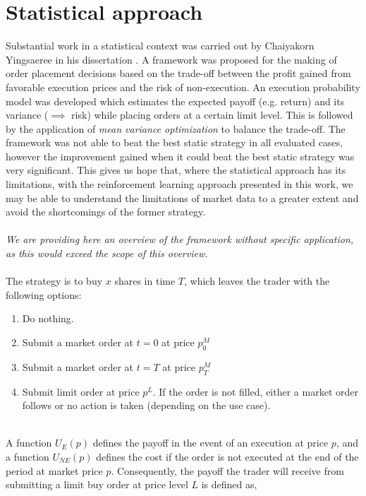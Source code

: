 \section{Statistical approach}
\label{sec:related-statistical}

Substantial work in a statistical context was carried out by Chaiyakorn Yingsaeree in his dissertation \cite{yingsaeree2012algorithmic}.
A framework was proposed for the making of order placement decisions based on the trade-off between the profit gained from favorable execution prices and the risk of non-execution.
An execution probability model was developed which estimates the expected payoff (e.g. return) and its variance ($\implies$ risk) while placing orders at a certain limit level.  This is followed by the application of \textit{mean variance optimization} to balance the trade-off.
The framework was not able to beat the best static strategy in all evaluated cases, however the improvement gained when it could beat the best static strategy was very significant.
This gives us hope that, where the statistical approach has its limitations, with the reinforcement learning approach presented in this work, we may be able to understand the limitations of market data to a greater extent and avoid the shortcomings of the former strategy.
\\
\\
\textit{We are providing here an overview of the framework without specific application, as this would exceed the scope of this overview.}
\\
\\
The strategy is to buy $x$ shares in time $T$, which leaves the trader with the following options:
\begin{enumerate}
    \item Do nothing.
    \item Submit a market order at $t=0$ at price $p_{0}^M$
    \item Submit a market order at $t=T$ at price $p_{T}^M$
    \item Submit limit order at price $p^L$. If the order is not filled, either a market order follows or no action is taken (depending on the use case).
\end{enumerate}
\hfill
\\
A function $U_{E}(p)$ defines the payoff in the event of an execution at price $p$, and a function $U_{NE}(p)$ defines the cost if the order is not executed at the end of the period at market price $p$. 
Consequently, the payoff the trader will receive from submitting a limit buy order at price level $L$ is defined as,
